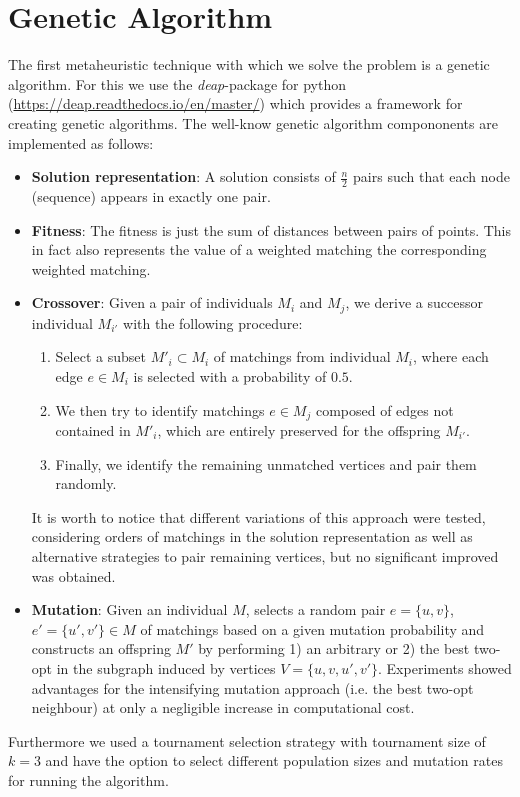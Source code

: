 \documentclass[12pt]{article}
\begin{document}
\section{Genetic Algorithm}
The first metaheuristic technique with which we solve the problem is a genetic algorithm.
For this we use the \textit{deap}-package for python (\url{https://deap.readthedocs.io/en/master/}) which provides a framework for creating genetic algorithms.
The well-know genetic algorithm compononents are implemented as follows:
\begin{itemize}
    \item \textbf{Solution representation}: A solution consists of $\frac{n}{2}$ pairs such that each node (sequence) appears in exactly one pair.
    \item \textbf{Fitness}: The fitness is just the sum of distances between pairs of points. 
    This in fact also represents the value of a weighted matching the corresponding weighted matching.
    \item \textbf{Crossover}: Given a pair of individuals $M_i$ and $M_j$, we derive a successor individual $M_{i'}$ with the following procedure:
    \begin{enumerate}
    	\item Select a subset $M'_i \subset M_i$ of matchings from individual $M_i$, where each edge $e \in M_i$ is selected with a probability of $0.5$. 
    	\item We then try to identify matchings $e \in M_j$ composed of edges not contained in $M'_i$, which are entirely preserved for the offspring $M_{i'}$.
    	\item Finally, we identify the remaining unmatched vertices and pair them randomly. 
    \end{enumerate}
    It is worth to notice that different variations of this approach were tested, considering orders of matchings in the solution representation as well as alternative strategies to pair remaining vertices, but no significant improved was obtained. 
    \item \textbf{Mutation}: Given an individual $M$, selects a random pair $e=\{u,v\}$, $e'=\{u',v'\} \in M$ of matchings based on a given mutation probability and constructs an offspring $M'$ by performing 1) an arbitrary or 2) the best two-opt in the subgraph induced by vertices $V=\{u,v,u',v'\}$. Experiments showed advantages for the intensifying mutation approach (i.e. the best two-opt neighbour) at only a negligible increase in computational cost. 
\end{itemize}
Furthermore we used a tournament selection strategy with tournament size of $k=3$ and have the option to select different population sizes and mutation rates for running the algorithm.
\end{document}
